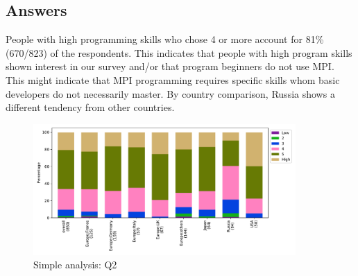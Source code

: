 
\subsection{Answers}


People with high programming skills who chose 4 or more
account for 81\% (670/823) of the respondents.
This indicates that people with high program skills shown interest
in our survey and/or that program beginners do not use MPI. This might indicate
that MPI programming requires specific skills whom basic developers do not
necessarily master. 
By country comparison, Russia shows a different tendency from 
other countries.

\begin{figure}[htb]
\begin{center}
\includegraphics[width=10cm]{../pdfs/Q2.pdf}
\caption{Simple analysis: Q2}
\label{fig:Q2}
\end{center}
\end{figure}